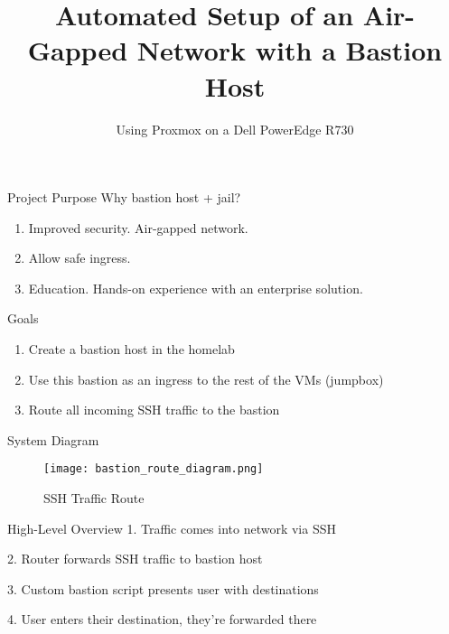 \documentclass[14pt,compress,dvipsnames,aspectratio=169]{beamer} %
\title{\textbf{Automated Setup of an Air-Gapped Network with a Bastion Host}}
\author{Using Proxmox on a Dell PowerEdge R730}
\date{}  %
\begin{document}

\begin{frame}[plain]
\titlepage
\end{frame}



\begin{frame}{Project Purpose}
    Why bastion host + jail?
    \begin{enumerate}
        \item{Improved security. Air-gapped network.} 
        \item{Allow safe ingress.}
        \item{Education. Hands-on experience with an enterprise solution.}
    \end{enumerate}
\end{frame}



\begin{frame}{Goals}
    \begin{enumerate}
        \item{Create a bastion host in the homelab} 
        \item{Use this bastion as an ingress to the rest of the VMs (jumpbox)}
        \item{Route all incoming SSH traffic to the bastion}
    \end{enumerate}
\end{frame}


\begin{frame}{System Diagram}
    \begin{figure}
        \centering
        \texttt{[image: bastion\_route\_diagram.png]}
        \caption{SSH Traffic Route}
    \end{figure}
\end{frame}





\begin{frame}{High-Level Overview}
        1. Traffic comes into network via SSH 
        \vspace{1.15cm}

        2. Router forwards SSH traffic to bastion host
        \vspace{1.15cm}

        3. Custom bastion script presents user with destinations
        \vspace{1.15cm}

        4. User enters their destination, they're forwarded there
\end{frame}
\end{document}
